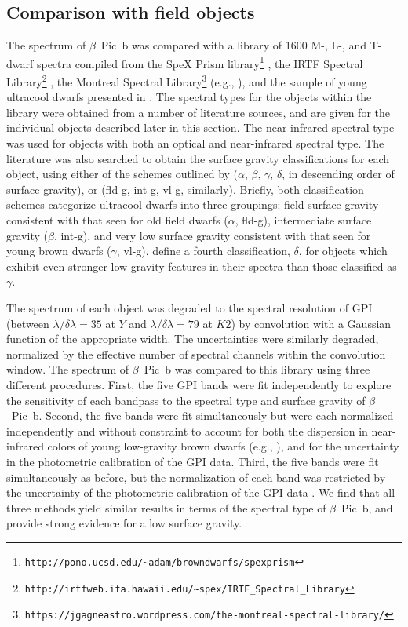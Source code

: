 \documentclass[twocolumn]{aastex6}
\begin{document}
\subsection{Comparison with field objects}
\label{sec:Comparison_w_field_ojb}
The spectrum of $\beta$~Pic~b was compared with a library of 1600 M-, L-, and T-dwarf spectra compiled from the SpeX Prism library\footnote{{\tt http://pono.ucsd.edu/\~{}adam/browndwarfs/spexprism}} \citep{2014ASInC..11....7B}, the IRTF Spectral Library\footnote{{\tt http://irtfweb.ifa.hawaii.edu/\~{}spex/IRTF\_Spectral\_Library}} \citep{2005ApJ...623.1115C}, the Montreal Spectral Library\footnote{{\tt https://jgagneastro.wordpress.com/the-montreal-spectral-library/}} (e.g., \citealp{Gagne:2015dc,2016arXiv160706117R}), and the sample of young ultracool dwarfs presented in \citet{Allers2013}. The spectral types for the objects within the library were obtained from a number of literature sources, and are given for the individual objects described later in this section. The near-infrared spectral type was used for objects with both an optical and near-infrared spectral type. The literature was also searched to obtain the surface gravity classifications for each object, using either of the schemes outlined by \citet{2005ARA&A..43..195K, 2006ApJ...639.1120K,2009AJ....137.3345C} ($\alpha$, $\beta$, $\gamma$, $\delta$, in descending order of surface gravity), or \citet{Allers2013} ({\sc fld-g}, {\sc int-g}, {\sc vl-g}, similarly). Briefly, both classification schemes categorize ultracool dwarfs into three groupings: field surface gravity consistent with that seen for old field dwarfs ($\alpha$, {\sc fld-g}), intermediate surface gravity ($\beta$, {\sc int-g}), and very low surface gravity consistent with that seen for young brown dwarfs ($\gamma$, {\sc vl-g}). \citet{2005ARA&A..43..195K} define a fourth classification, $\delta$, for objects which exhibit even stronger low-gravity features in their spectra than those classified as $\gamma$.

The spectrum of each object was degraded to the spectral resolution of GPI (between $\lambda/\delta\lambda=35$ at $Y$ and $\lambda/\delta\lambda=79$ at $K2$) by convolution with a Gaussian function of the appropriate width. The uncertainties were similarly degraded, normalized by the effective number of spectral channels within the convolution window. The spectrum of $\beta$~Pic~b was compared to this library using three different procedures. First, the five GPI bands were fit independently to explore the sensitivity of each bandpass to the spectral type and surface gravity of $\beta$~Pic~b. Second, the five bands were fit simultaneously but were each normalized independently and without constraint to account for both the dispersion in near-infrared colors of young low-gravity brown dwarfs (e.g., \citealp{Leggett2003}), and for the uncertainty in the photometric calibration of the GPI data. Third, the five bands were fit simultaneously as before, but the normalization of each band was restricted by the uncertainty of the photometric calibration of the GPI data \citep{2014SPIE.9147E..85M}. We find that all three methods yield similar results in terms of the spectral type of $\beta$~Pic~b, and provide strong evidence for a low surface gravity.
\end{document}
